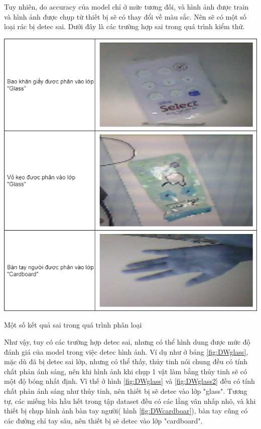 Tuy nhiên, do accuracy của model chỉ ở mức tương đối, và hình ảnh được train và hình ảnh được chụp từ thiết bị sẽ có thay đổi về màu sắc. Nên sẽ có một số loại rác bị detec sai. Dưới đây là các trường hợp sai trong quá trình kiểm thử.
\begin{table}[H]
    \centering
    \includegraphics[width=\linewidth]{images/Quanh/Trash Failed.png}
    \caption{Một số kết quả sai trong quá trình phân loại}
    \label{fig:DWglass}
\end{table}

Như vậy, tuy có các trường hợp detec sai, nhưng có thể hình dung được mức độ đánh giá của model trong việc detec hình ảnh. Ví dụ như ở bảng \ref{fig:DWglass}, mặc dù đã bị detec sai lớp, nhưng có thể thấy, thủy tinh nói chung đều có tính chất phản ánh sáng, nên khi hình ảnh khi chụp 1 vật làm bằng thủy tinh sẽ có một độ bóng nhất định. Vì thế ở hình \ref{fig:DWglass} và \ref{fig:DWglass2} đều có tính chất phản ánh sáng như thủy tinh, nên thiết bị sẽ detec vào lớp "glass". Tương tự, các miếng bìa hầu hết trong tập dataset đều có các lằng vân nhấp nhô, và khi thiết bị chụp hình ảnh bàn tay người( hình \ref{fig:DWcardboar}), bàn tay cũng có các đường chỉ tay sâu, nên thiết bị sẽ detec vào lớp "cardboard".

